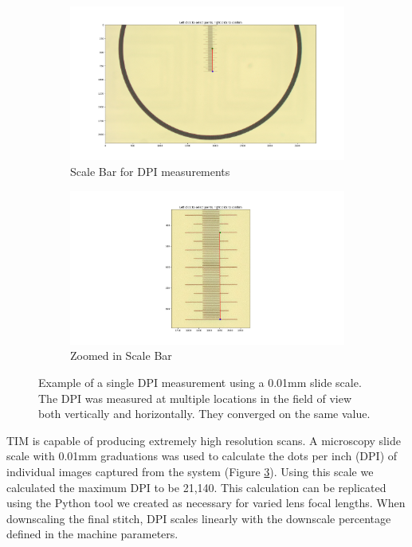 \documentclass[a4paper,12pt]{article}
\begin{document}
\begin{figure}
  \centering
  \begin{subfigure}{.5\textwidth}
    \centering
    \includegraphics[height=0.5\linewidth]{../diagrams/dpi_measurement_whole.png}
    \caption{Scale Bar for DPI measurements}
    \label{fig:dpi_measurement_whole}
  \end{subfigure}%
  \begin{subfigure}{.5\textwidth}
    \centering
    \includegraphics[height=0.5\linewidth]{../diagrams/dpi_measurement_zoomed_2.png}
    \caption{Zoomed in Scale Bar}
    \label{fig:dpi_measurement_zoomed}
  \end{subfigure}
  \caption{Example of a single DPI measurement using a 0.01mm slide scale. The DPI was measured at multiple locations in the field of view both vertically and horizontally. They converged on the same value.}
  \label{fig:dpi_measurements}
\end{figure}

TIM is capable of producing extremely high resolution scans.
A microscopy slide scale with 0.01mm graduations was used to calculate the dots per inch (DPI) of individual images captured from the system (Figure \ref{fig:dpi_measurements}).  
Using this scale we calculated the maximum DPI to be 21,140. This calculation can be replicated using the Python tool we created as necessary for varied lens focal lengths. When downscaling the final stitch, 
DPI scales linearly with the downscale percentage defined in the machine parameters. 
\end{document}

